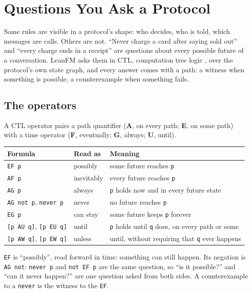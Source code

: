 \chapter{Questions You Ask a Protocol}
\label{ch:questions}
\label{ch:ctl}

Some rules are visible in a protocol's shape: who decides, who is told, which
messages are calls. Others are not. ``Never charge a card after saying sold
out'' and ``every charge ends in a receipt'' are questions about every possible
future of a conversation. LeanFM asks them in CTL, computation tree logic
\citep{clarke1986automatic}, over the protocol's own state graph, and every answer
comes with a path: a witness when something is possible, a counterexample when
something fails.

\section{The operators}

A CTL operator pairs a path quantifier (\textbf{A}, on every path; \textbf{E}, on
some path) with a time operator (\textbf{F}, eventually; \textbf{G}, always;
\textbf{U}, until).

\begin{center}
\small
\begin{tabular}{@{}llp{}@{}}
\toprule
Formula & Read as & Meaning \\
\midrule
\texttt{EF p} & possibly & some future reaches \texttt{p} \\
\texttt{AF p} & inevitably & every future reaches \texttt{p} \\
\texttt{AG p} & always & \texttt{p} holds now and in every future state \\
\texttt{AG not p}, \texttt{never p} & never & no future reaches \texttt{p} \\
\texttt{EG p} & can stay & some future keeps \texttt{p} forever \\
\texttt{[p AU q]}, \texttt{[p EU q]} & until & \texttt{p} holds until \texttt{q} does, on every path or some \\
\texttt{[p AW q]}, \texttt{[p EW q]} & unless & until, without requiring that \texttt{q} ever happens \\
\bottomrule
\end{tabular}
\end{center}

\texttt{EF} is ``possibly'', read forward in time: something can still happen.
Its negation is \texttt{AG not}: \texttt{never p} and \texttt{not EF p} are the
same question, so ``is it possible?'' and ``can it never happen?'' are one
question asked from both sides. A counterexample to a \texttt{never} is the
witness to the \texttt{EF}.

